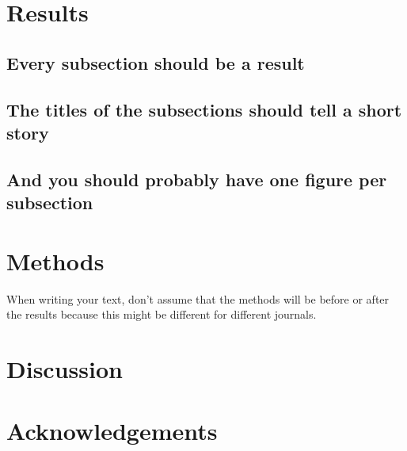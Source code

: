 \documentclass{article}
\begin{document}
\section{Results}\label{sec:results}

\subsection{Every subsection should be a result}

\subsection{The titles of the subsections should tell a short story}

\subsection{And you should probably have one figure per subsection}

\section{Methods}\label{sec:methods}

When writing your text, don't assume that the methods will be before or after the results because this might be different for different journals.

\section{Discussion}\label{sec:discussion}

\section*{Acknowledgements}\label{sec:acknowledgements}



\end{document}

